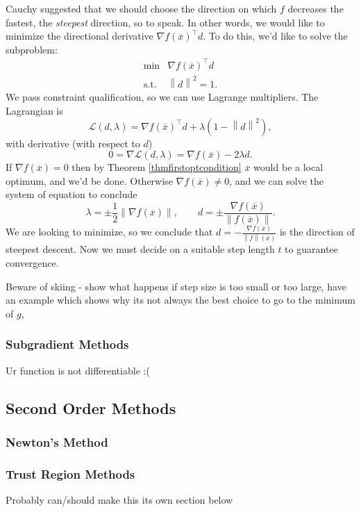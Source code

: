 \documentclass[11pt]{article}
\numberwithin{equation}{section}
\theoremstyle{definition}
\newcommand{\cL}{\mathcal{L}}
\newcommand{\norm}[1]{\left\lVert#1\right\rVert}
\newcommand{\ox}{\overline{x}}
\begin{document}
Cauchy suggested that we should choose the direction on which $f$ decreases the fastest, the \textit{steepest} direction, so to speak. In other words, we would like to minimize the directional derivative $\nabla f(\ox)^\top d$. To do this, we'd like to solve the subproblem:
\begin{equation}
    \begin{array}{cc}
         \min & \nabla f(\ox)^\top d \\
         \mathrm{s.t.} & \norm d^2=1.
    \end{array}
\end{equation}
We pass constraint qualification, so we can use Lagrange multipliers. The Lagrangian is
\begin{equation}
    \cL(d,\lambda)=\nabla f(\ox)^\top d+\lambda(1-\norm d^2),
\end{equation}
with derivative (with respect to $d$)
\begin{equation}
    0=\nabla\cL(d,\lambda)=\nabla f(\ox) - 2\lambda d.
\end{equation}
If $\nabla f(\ox)=0$ then by Theorem \ref{thmfirstoptcondition} $\ox$ would be a local optimum, and we'd be done. Otherwise $\nabla f(\ox)\neq 0$, and we can solve the system of equation to conclude
\begin{equation}
    \lambda=\pm\frac12\norm{\nabla f(\ox)},\qquad d=\pm\frac{\nabla f(\ox)}{\norm {f(\ox)}}.
\end{equation}
We are looking to minimize, so we conclude that $d=-\frac{\nabla f(\ox)}{\norm f(\ox)}$ is the direction of steepest descent. Now we must decide on a suitable step length $t$ to guarantee convergence.

Beware of skiing - show what happens if step size is too small or too large, have an example which shows why its not always the best choice to go to the minimum of $g$, 
\subsubsection{Subgradient Methods}
Ur function is not differentiable :(
\subsection{Second Order Methods}
\subsubsection{Newton's Method}
\subsubsection{Trust Region Methods}
Probably can/should make this its own section below
\end{document}

